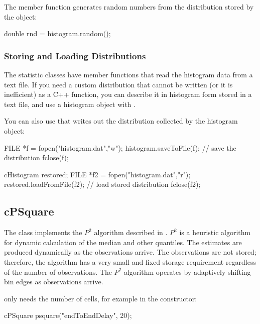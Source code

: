The  member function generates random
numbers from the distribution stored by the
object:

\begin{cpp}
double rnd = histogram.random();
\end{cpp}


\subsubsection{Storing and Loading Distributions}
\label{sec:sim-lib:storing-and-loading-distributions}

The statistic classes have  member functions
that read the histogram data from a text file. If you need a custom
distribution that cannot be written (or it
is inefficient) as a C++ function, you can describe it in histogram form
stored in a text file, and use a histogram object with
.

You can also use  that writes out the distribution
collected by the histogram object:

\begin{cpp}
FILE *f = fopen("histogram.dat","w");
histogram.saveToFile(f); // save the distribution
fclose(f);

cHistogram restored;
FILE *f2 = fopen("histogram.dat","r");
restored.loadFromFile(f2); // load stored distribution
fclose(f2);
\end{cpp}


\subsection{cPSquare}
\label{sec:sim-lib:psquare}

The  class implements the $P^{2}$ algorithm
described in \cite{JCh85}. $P^{2}$ is a heuristic algorithm
for dynamic calculation of the median and other quantiles.
The estimates are produced dynamically as the observations arrive.
The observations are not stored; therefore, the algorithm has
a very small and fixed storage requirement regardless of
the number of observations. The $P^{2}$ algorithm operates
by adaptively shifting bin edges as observations arrive.

 only needs the number of cells, for example
in the constructor:

\begin{cpp}
cPSquare psquare("endToEndDelay", 20);
\end{cpp}


